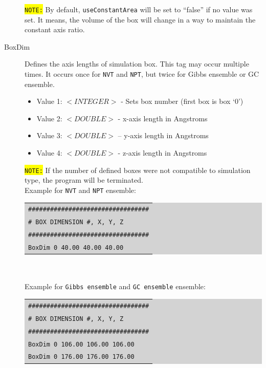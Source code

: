 \begin{description}
\begin{itemize}
	\end{itemize}
	\colorbox{yellow}{\texttt{NOTE:}} By default, \texttt{useConstantArea} will be set to ``false'' if no value was set. It means, the volume of the box will change in a way to maintain the constant axis ratio.
\item [BoxDim] Defines the axis lengths of simulation box. This tag may occur multiple times.  It occurs once for \texttt{NVT} and \texttt{NPT}, but twice for Gibbs ensemble or GC ensemble.
	\begin{itemize}
	\item Value 1: $<INTEGER>$ - Sets box number (first box is box `0')
	\item Value 2: $<DOUBLE>$ - x-axis length in Angstroms
	\item Value 3: $<DOUBLE>$ – y-axis length in Angstroms
	\item Value 4: $<DOUBLE>$ - z-axis length in Angstroms
	\end{itemize}
	\colorbox{yellow}{\texttt{NOTE:}} If the number of defined boxes were not compatible to simulation type, the program will be terminated.\\
	Example for \texttt{NVT} and \texttt{NPT} ensemble:\\
	\colorbox{lightgray}{
	\begin{tabular}{l}
	\texttt{\#\#\#\#\#\#\#\#\#\#\#\#\#\#\#\#\#\#\#\#\#\#\#\#\#\#\#\#\#\#\#\#\#}\\
	\texttt{\#  BOX DIMENSION \#, X, Y, Z}\\
	\texttt{\#\#\#\#\#\#\#\#\#\#\#\#\#\#\#\#\#\#\#\#\#\#\#\#\#\#\#\#\#\#\#\#\#}\\
	\texttt{BoxDim 0 40.00 40.00 40.00}\\
	\end{tabular}}\\\\
	Example for \texttt{Gibbs ensemble} and \texttt{GC ensemble} ensemble:\\
	\colorbox{lightgray}{
	\begin{tabular}{l}
	\texttt{\#\#\#\#\#\#\#\#\#\#\#\#\#\#\#\#\#\#\#\#\#\#\#\#\#\#\#\#\#\#\#\#\#}\\
	\texttt{\#  BOX DIMENSION \#, X, Y, Z}\\
	\texttt{\#\#\#\#\#\#\#\#\#\#\#\#\#\#\#\#\#\#\#\#\#\#\#\#\#\#\#\#\#\#\#\#\#}\\
	\texttt{BoxDim 0 106.00 106.00 106.00}\\
	\texttt{BoxDim 0 176.00 176.00 176.00}\\
	\end{tabular}}

\end{description}
